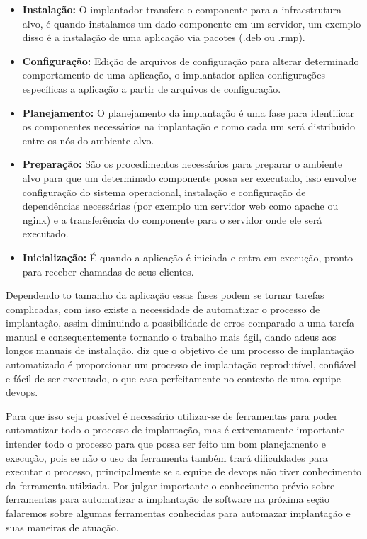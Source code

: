 \begin{itemize}
  \item  \textbf{Instalação:} O implantador transfere o componente para a infraestrutura
  alvo, é quando instalamos um dado componente em um servidor, um exemplo disso
  é a instalação de uma aplicação via pacotes (.deb ou .rmp).
  \item  \textbf{Configuração:} Edição de arquivos de configuração para alterar
  determinado comportamento de uma aplicação, o implantador aplica configurações
  específicas a aplicação a partir de arquivos de configuração.
  \item  \textbf{Planejamento:} O planejamento da implantação é uma fase
  para identificar os componentes necessários na implantação e como cada um será
  distribuido entre os nós do ambiente alvo.
  \item  \textbf{Preparação:} São os procedimentos necessários para preparar o
  ambiente alvo para que um determinado componente possa ser executado, isso envolve
  configuração do sistema operacional, instalação e configuração de dependências
  necessárias (por exemplo um servidor web como apache ou nginx) e a transferência
  do componente para o servidor onde ele será executado.
  \item  \textbf{Inicialização:} É quando a aplicação é iniciada e entra em execução,
  pronto para receber chamadas de seus clientes.
\end{itemize}

Dependendo to tamanho da aplicação essas fases podem se tornar tarefas complicadas,
com isso existe a necessidade de automatizar o processo de implantação, assim
diminuindo a possibilidade de erros comparado a uma tarefa manual e consequentemente
tornando o trabalho mais ágil, dando adeus aos longos manuais de instalação.
\cite{humble2010} diz que o objetivo de um processo de implantação automatizado é
proporcionar um processo de implantação reprodutível, confiável e fácil de ser
executado, o que casa perfeitamente no contexto de uma equipe devops.

Para que isso seja possível é necessário utilizar-se de ferramentas para poder
automatizar todo o processo de implantação, mas é extremamente importante intender todo o processo
para que possa ser feito um bom planejamento e execução, pois se não o uso da ferramenta também
trará dificuldades para executar o processo, principalmente se a equipe de devops não tiver conhecimento
da ferramenta utilziada. Por julgar importante o conhecimento prévio sobre ferramentas
para automatizar a implantação de software na próxima seção falaremos sobre algumas
ferramentas conhecidas para automazar implantação e suas maneiras de atuação.

